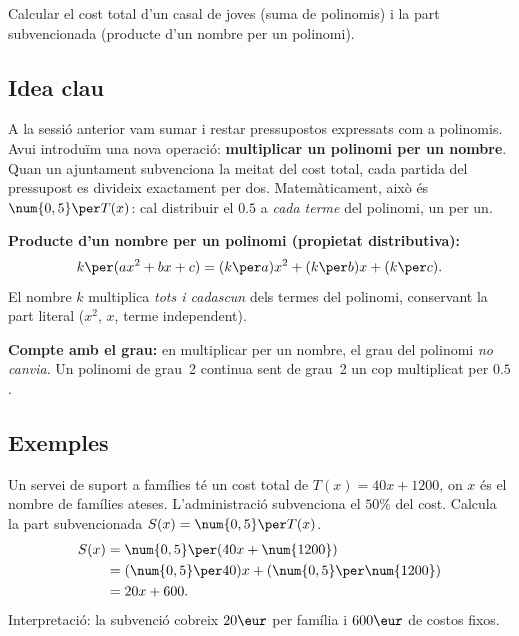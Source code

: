 %
{Calcular el cost total d'un casal de joves (suma de polinomis) i la part
subvencionada (producte d'un nombre per un polinomi).}

\subsection{Idea clau}

A la sessió anterior vam sumar i restar pressupostos expressats com a polinomis.
Avui introduïm una nova operació: \textbf{multiplicar un polinomi per un nombre}.
Quan un ajuntament subvenciona la meitat del cost total, cada partida del
pressupost es divideix exactament per dos. Matemàticament, això és
$\num{0,5}\per T(x)$: cal distribuir el $\num{0,5}$ a \emph{cada terme} del
polinomi, un per un.

\begin{idea}
\textbf{Producte d'un nombre per un polinomi (propietat distributiva):}
\[
k\per(ax^2 + bx + c) = (k\per a)x^2 + (k\per b)x + (k\per c).
\]
El nombre $k$ multiplica \emph{tots i cadascun} dels termes del polinomi,
conservant la part literal ($x^2$, $x$, terme independent).

\medskip
\textbf{Compte amb el grau:} en multiplicar per un nombre, el grau del polinomi
\emph{no canvia}. Un polinomi de grau~2 continua sent de grau~2 un cop multiplicat
per $\num{0,5}$.
\end{idea}

\subsection{Exemples}

\begin{exemple}
Un servei de suport a famílies té un cost total de $T(x) = 40x + \num{1200}$,
on $x$ és el nombre de famílies ateses. L'administració subvenciona el
$50\%$ del cost. Calcula la part subvencionada $S(x) = \num{0,5}\per T(x)$.
\begin{align*}
S(x) &= \num{0,5}\per(40x + \num{1200}) \\
     &= (\num{0,5}\per 40)x + (\num{0,5}\per\num{1200}) \\
     &= 20x + 600.
\end{align*}
Interpretació: la subvenció cobreix $20\eur$ per família i $600\eur$ de costos
fixos.
\end{exemple}

